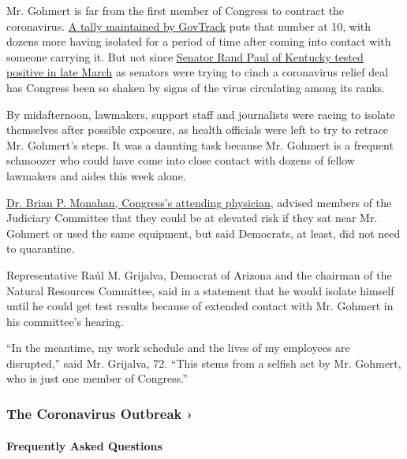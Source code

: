 Mr. Gohmert is far from the first member of Congress to contract the
coronavirus. \href{https://www.govtrack.us/covid-19\#legislators}{A
tally maintained by GovTrack} puts that number at 10, with dozens more
having isolated for a period of time after coming into contact with
someone carrying it. But not since
\href{https://www.nytimes.com/2020/03/22/us/politics/coronavirus-rand-paul.html}{Senator
Rand Paul of Kentucky tested positive in late March} as senators were
trying to cinch a coronavirus relief deal has Congress been so shaken by
signs of the virus circulating among its ranks.

By midafternoon, lawmakers, support staff and journalists were racing to
isolate themselves after possible exposure, as health officials were
left to try to retrace Mr. Gohmert's steps. It was a daunting task
because Mr. Gohmert is a frequent schmoozer who could have come into
close contact with dozens of fellow lawmakers and aides this week alone.

\href{https://www.nytimes.com/2020/05/16/us/politics/congress-doctor-virus-brian-monahan.html}{Dr.
Brian P. Monahan, Congress's attending physician}, advised members of
the Judiciary Committee that they could be at elevated risk if they sat
near Mr. Gohmert or used the same equipment, but said Democrats, at
least, did not need to quarantine.

Representative Raúl M. Grijalva, Democrat of Arizona and the chairman of
the Natural Resources Committee, said in a statement that he would
isolate himself until he could get test results because of extended
contact with Mr. Gohmert in his committee's hearing.

``In the meantime, my work schedule and the lives of my employees are
disrupted,'' said Mr. Grijalva, 72. ``This stems from a selfish act by
Mr. Gohmert, who is just one member of Congress.''

\href{https://www.nytimes.com/news-event/coronavirus?action=click\&pgtype=Article\&state=default\&region=MAIN_CONTENT_3\&context=storylines_faq}{}

\hypertarget{the-coronavirus-outbreak-}{%
\subsubsection{The Coronavirus Outbreak
›}\label{the-coronavirus-outbreak-}}

\hypertarget{frequently-asked-questions}{%
\paragraph{Frequently Asked
Questions}\label{frequently-asked-questions}}

